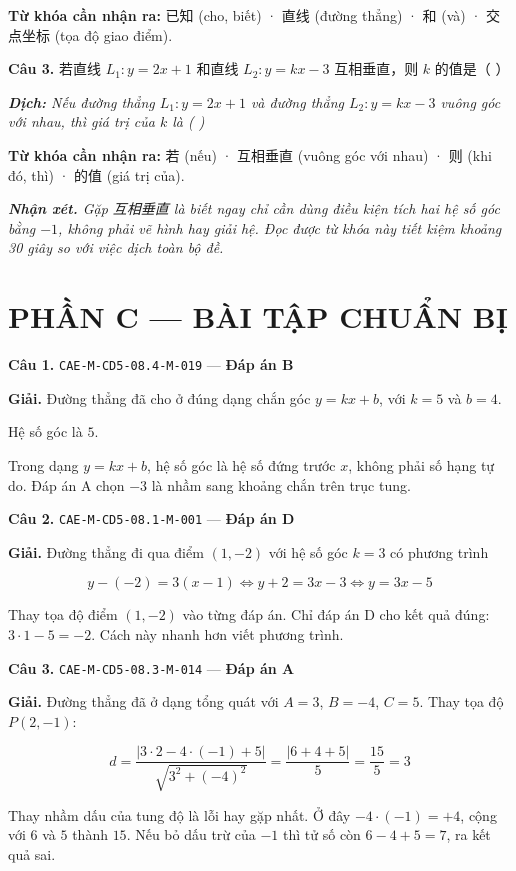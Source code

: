 \documentclass[11pt, a4paper]{article}
\begin{document}
\textbf{Từ khóa cần nhận ra:} 已知 (cho, biết) · 直线 (đường thẳng) · 和 (và) · 交点坐标 (tọa độ giao điểm).

\textbf{Câu 3.} 若直线 $L_1: y = 2x + 1$ 和直线 $L_2: y = kx - 3$ 互相垂直，则 $k$ 的值是（ ）

\noindent\emph{\textbf{Dịch:} Nếu đường thẳng $L_1: y = 2x + 1$ và đường thẳng $L_2: y = kx - 3$ vuông góc với nhau, thì giá trị của $k$ là ( )}

\textbf{Từ khóa cần nhận ra:} 若 (nếu) · 互相垂直 (vuông góc với nhau) · 则 (khi đó, thì) · 的值 (giá trị của).

\noindent\emph{\textbf{Nhận xét.} Gặp 互相垂直 là biết ngay chỉ cần dùng điều kiện tích hai hệ số góc bằng $-1$, không phải vẽ hình hay giải hệ. Đọc được từ khóa này tiết kiệm khoảng 30 giây so với việc dịch toàn bộ đề.}

\section{PHẦN C — BÀI TẬP CHUẨN BỊ}

\textbf{Câu 1.} \texttt{CAE-M-CD5-08.4-M-019} — \textbf{Đáp án B}

\textbf{Giải.} Đường thẳng đã cho ở đúng dạng chắn góc $y = kx + b$, với $k = 5$ và $b = 4$.

Hệ số góc là $5$.

 Trong dạng $y = kx + b$, hệ số góc là hệ số đứng trước $x$, không phải số hạng tự do. Đáp án A chọn $-3$ là nhầm sang khoảng chắn trên trục tung.

\textbf{Câu 2.} \texttt{CAE-M-CD5-08.1-M-001} — \textbf{Đáp án D}

\textbf{Giải.} Đường thẳng đi qua điểm $(1, -2)$ với hệ số góc $k = 3$ có phương trình

$$y - (-2) = 3(x - 1) \iff y + 2 = 3x - 3 \iff y = 3x - 5$$

 Thay tọa độ điểm $(1, -2)$ vào từng đáp án. Chỉ đáp án D cho kết quả đúng: $3 \cdot 1 - 5 = -2$. Cách này nhanh hơn viết phương trình.

\textbf{Câu 3.} \texttt{CAE-M-CD5-08.3-M-014} — \textbf{Đáp án A}

\textbf{Giải.} Đường thẳng đã ở dạng tổng quát với $A = 3$, $B = -4$, $C = 5$. Thay tọa độ $P(2, -1)$:

$$d = \frac{|3 \cdot 2 - 4 \cdot (-1) + 5|}{\sqrt{3^2 + (-4)^2}} = \frac{|6 + 4 + 5|}{5} = \frac{15}{5} = 3$$

 Thay nhầm dấu của tung độ là lỗi hay gặp nhất. Ở đây $-4 \cdot (-1) = +4$, cộng với $6$ và $5$ thành $15$. Nếu bỏ dấu trừ của $-1$ thì tử số còn $6 - 4 + 5 = 7$, ra kết quả sai.
\end{document}
